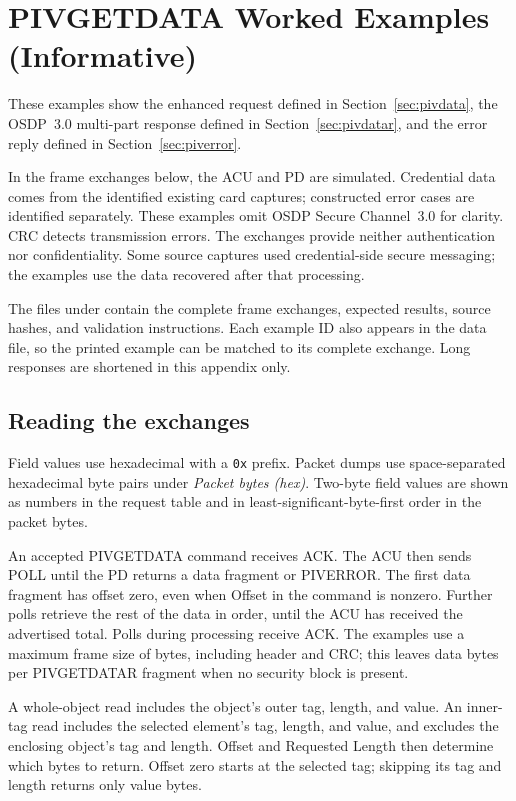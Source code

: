 \section{PIVGETDATA Worked Examples (Informative)}
\label{app:pivdata-examples}

These examples show the enhanced request defined in
Section~\ref{sec:pivdata}, the OSDP~3.0 multi-part response defined in
Section~\ref{sec:pivdatar}, and the error reply defined in
Section~\ref{sec:piverror}.

In the frame exchanges below, the ACU and PD are simulated. Credential data comes from the identified
existing card captures; constructed error cases are identified separately.
These examples omit OSDP Secure Channel~3.0 for clarity. CRC detects
transmission errors. The exchanges provide neither authentication nor
confidentiality. Some source captures used credential-side secure messaging;
the examples use the data recovered after that processing.

The files under  contain the complete frame
exchanges, expected results, source hashes, and validation instructions.
Each example ID also appears in the data file, so the printed example can be
matched to its complete exchange. Long responses are shortened in this appendix only.

\subsection{Reading the exchanges}
Field values use hexadecimal with a \texttt{0x} prefix. Packet dumps use
space-separated hexadecimal byte pairs under \emph{Packet bytes (hex)}.
Two-byte field values are shown as numbers in the request table and in
least-significant-byte-first order in the packet bytes.

An accepted PIVGETDATA command receives ACK. The ACU then sends POLL until the
PD returns a data fragment or PIVERROR. The first data fragment has offset zero,
even when Offset in the command is nonzero. Further polls retrieve the rest
of the data in order, until the ACU has received the advertised total.
Polls during processing receive ACK. The examples use a maximum frame size
of  bytes, including header and CRC; this leaves  data bytes per
PIVGETDATAR fragment when no security block is present.

A whole-object read includes the object's outer tag, length, and value.
An inner-tag read includes the selected element's tag, length, and value,
and excludes the enclosing object's tag and length. Offset and Requested Length
then determine which bytes to return. Offset zero starts at the selected tag;
skipping its tag and length returns only value bytes.

